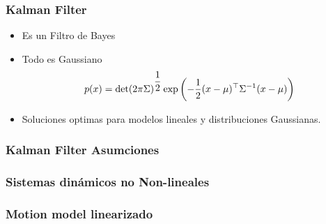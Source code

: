 \begin{frame}
	\frametitle{Kalman Filter}
	
	\begin{itemize}
		\item Es un Filtro de Bayes
		\item Todo es Gaussiano
		\begin{equation*}
			p(x)=\det(2\pi\Sigma)^{\dfrac{1}{2}} \exp\left(-\dfrac{1}{2} (x - \mu )^{\top} {\Sigma}^{-1} (x - \mu )  \right)
		\end{equation*}
		
		\item Soluciones optimas para modelos lineales y distribuciones Gaussianas.
	\end{itemize}

	\begin{figure}[!h]
		\centering
	\end{figure}
\end{frame}


\begin{frame}
	\frametitle{Kalman Filter Asumciones}
	
	
\end{frame}

\begin{frame}
	\frametitle{Sistemas dinámicos no Non-lineales}
	
	
\end{frame}

\begin{frame}
	\frametitle{Motion model linearizado}
	
	
\end{frame}

